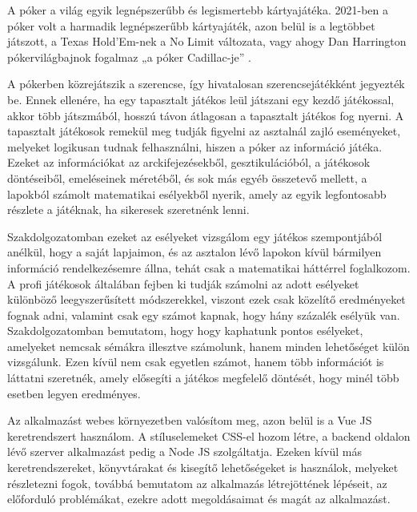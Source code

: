 
A póker a világ egyik legnépszerűbb és legismertebb kártyajátéka. 2021-ben a póker volt a harmadik legnépszerűbb kártyajáték, azon belül is a legtöbbet játszott, a \linebreak Texas Hold’Em-nek a No Limit változata, vagy ahogy Dan Harrington pókervilágbajnok fogalmaz „a póker Cadillac-je” \cite{harrington}. 

A pókerben közrejátszik a szerencse, így hivatalosan szerencsejátékként jegyezték be. Ennek ellenére, ha egy tapasztalt játékos leül játszani egy kezdő játékossal, akkor több játszmából, hosszú távon átlagosan a tapasztalt játékos fog nyerni. A tapasztalt játékosok remekül meg tudják figyelni az asztalnál zajló eseményeket, melyeket logikusan tudnak felhasználni, hiszen a póker az információ játéka. Ezeket az információkat az arckifejezésekből, gesztikulációból, a játékosok döntéseiből, emeléseinek méretéből, és sok más egyéb összetevő mellett, a lapokból számolt matematikai esélyekből nyerik, amely az egyik legfontosabb részlete a játéknak, ha sikeresek szeretnénk lenni.

Szakdolgozatomban ezeket az esélyeket vizsgálom egy játékos szempontjából anélkül, hogy a saját lapjaimon, és az asztalon lévő lapokon kívül bármilyen információ rendelkezésemre állna, tehát csak a matematikai háttérrel foglalkozom. A profi játékosok általában fejben ki tudják számolni az adott esélyeket különböző leegyszerűsített módszerekkel, viszont ezek csak közelítő eredményeket fognak adni, valamint csak egy számot kapnak, hogy hány százalék esélyük van. Szakdolgozatomban bemutatom, hogy hogy kaphatunk pontos esélyeket, amelyeket nemcsak sémákra illesztve számolunk, hanem minden lehetőséget külön vizsgálunk. Ezen kívül nem csak egyetlen számot, hanem több információt is láttatni szeretnék, amely elősegíti a játékos megfelelő döntését, hogy minél több esetben legyen eredményes.

Az alkalmazást webes környezetben valósítom meg, azon belül is a Vue JS keretrendszert használom. A stíluselemeket CSS-el hozom létre, a backend oldalon lévő szerver alkalmazást pedig a Node JS szolgáltatja. Ezeken kívül más keretrendszereket, könyvtárakat és kisegítő lehetőségeket is használok, melyeket részletezni fogok, továbbá bemutatom az alkalmazás létrejöttének lépéseit, az előforduló problémákat, ezekre adott megoldásaimat és magát az alkalmazást.
